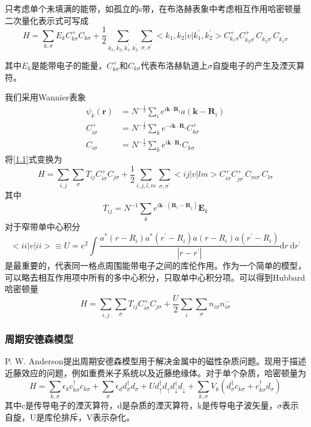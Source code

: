 只考虑单个未填满的能带，如孤立的s带，在布洛赫表象中考虑相互作用哈密顿量二次量化表示式可写成
\begin{equation}
    H=\sum_{k, \sigma} E_{k} C_{k \sigma}^{+} C_{k \sigma}+\frac{1}{2} \sum_{k_{1}, k_{2}, k_{1}^{\prime}, k_{2}^{\prime}} \sum_{\sigma, \sigma^{\prime}}<k_{1}, k_{2}|v| k_{1}^{\prime}, k_{2}^{\prime}>C_{k_{1} \sigma}^{+} C_{k_{2} \sigma^{\prime}}^{+} C_{k^{\prime}_2 \sigma^{\prime}} C_{k^{\prime}_1 \sigma}
    \label{1.1}
\end{equation}

其中$E_k$是能带电子的能量，$C^+_{k \sigma}$和$C_{k \sigma}$代表布洛赫轨道上$\sigma$自旋电子的产生及湮灭算符。

我们采用Wannier表象
\begin{align*}
    \psi_k(\textbf{r})&=N^{-\frac{1}{2}}\sum_i e^{i\textbf{k}\cdot \textbf{R}_i} a(\textbf{k} - \textbf{R}_i)\\
    C^+_{i \sigma}&=N^{-\frac{1}{2}} \sum_k e^{- i\textbf{k}\cdot \textbf{R}_i} C^+_{k \sigma}\\
    C_{i \sigma}&=N^{-\frac{1}{2}} \sum_k e^{i\textbf{k}\cdot \textbf{R}_i} C_{k \sigma}
\end{align*}
将\ref{1.1}式变换为
$$
H=\sum_{i, j} \sum_{\sigma} T_{i j} C_{i \sigma}^{+} C_{j \sigma}+\frac{1}{2} \sum_{i, j, l, m} \sum_{\sigma, \sigma^{\prime}}<i j|v| l m>C_{i \sigma}^{+} C_{j \sigma^{\prime}}^{+} C_{m \sigma^{\prime}} C_{l \sigma}
$$
其中
$$T_{ij}=N^{-1}\sum_k e^{i \textbf{k} \cdot (\textbf{R}_i-\textbf{R}_j)}\textbf{E}_k$$
对于窄带单中心积分
$$
<i i|v| i i>\equiv U=e^{2} \int \frac{a^{*}\left(r-R_{i}\right) a^{*}\left(r^{\prime}-R_{i}\right) a\left(r-R_{i}\right) a\left(r^{\prime}-R_{i}\right)}{\left|r-r^{\prime}\right|} \mathrm{d} r \mathrm{~d} r^{\prime}
$$
是最重要的，代表同一格点周围能带电子之间的库伦作用。作为一个简单的模型，可以略去相互作用项中所有的多中心积分，只取单中心积分项。可以得到Hubbard哈密顿量
$$
H=\sum_{i, j} \sum_{\sigma} T_{i j} C_{i \sigma}^{+} C_{j \sigma}+\frac{U}{2} \sum_{i} \sum_{\sigma} n_{i \sigma} n_{i \sigma}^{-}
$$

\subsubsection{周期安德森模型}
P. W. Anderson提出周期安德森模型用于解决金属中的磁性杂质问题\cite{2}。现用于描述近藤效应的问题，例如重费米子系统以及近藤绝缘体。对于单个杂质，哈密顿量为
$$
H=\sum_{k, \sigma} \epsilon_{k} c_{k \sigma}^{\dagger} c_{k \sigma}+\sum_{\sigma} \epsilon_{d} d_{\sigma}^{\dagger} d_{\sigma}+U d_{\uparrow}^{\dagger} d_{\uparrow} d_{\downarrow}^{\dagger} d_{\downarrow}+\sum_{k, \sigma} V_{k}\left(d_{\sigma}^{\dagger} c_{k \sigma}+c_{k \sigma}^{\dagger} d_{\sigma}\right)
$$
其中c是传导电子的湮灭算符，d是杂质的湮灭算符，k是传导电子波矢量，$\sigma$表示自旋，U是库伦排斥，V表示杂化。

